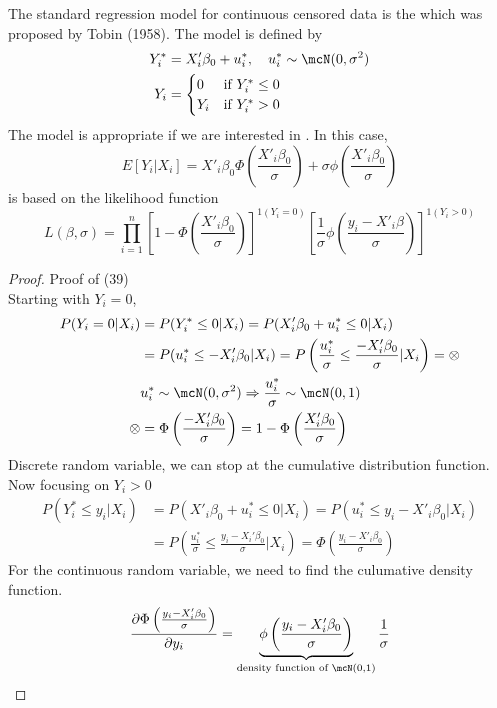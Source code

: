 The standard regression model for continuous censored data is the  which was proposed by Tobin (1958).
The model is defined by 
\begin{align*}
    Y^*_i & = X'_i\beta_0 + u_i^*,\quad u_i^*\sim\mcN(0,\sigma^2)\\
    Y_i & = \begin{cases}
        0 & \text{if }Y_i^* \leq 0\\
        Y_i & \text{if }Y_i^*>0
    \end{cases}
\end{align*}
The model is appropriate if we are interested in .
In this case,
\begin{equation*}
    E[Y_i|X_i] = X'_i\beta_0\Phi(\frac{X'_i\beta_0}{\sigma})+\sigma\phi(\frac{X'_i\beta_0}{\sigma})
\end{equation*}
 is based on the likelihood function 
\begin{equation}
    L(\beta,\sigma) = \prod_{i=1}^{n}\left[1-\Phi(\frac{X'_i\beta_0}{\sigma})\right]^{1(Y_i=0)}\left[\frac{1}{\sigma}\phi\left(\frac{y_i-X'_i\beta}{\sigma}\right)\right]^{1(Y_i>0)}
\end{equation}
\begin{proof}
    Proof of (39)\\
    Starting with $Y_i=0$,
    \begin{align*}
        P(Y_i=0|X_i) & = P(Y_i^*\leq 0|X_i) = P(X'_i\beta_0+u_i^*\leq 0|X_i)\\
        & = P(u_i^*\leq -X'_i\beta_0|X_i) = P\left(\frac{u_i^*}{\sigma}\leq\frac{-X_i'\beta_0}{\sigma}|X_i\right) = \otimes \\
        & u_i^*\sim\mcN(0,\sigma^2)\Rightarrow\frac{u_i^*}{\sigma}\sim\mcN(0,1)\\
        \otimes & = \Phi\left(\frac{-X'_i\beta_0}{\sigma}\right) = 1-\Phi\left(\frac{X'_i\beta_0}{\sigma}\right)
    \end{align*}
    Discrete random variable, we can stop at the cumulative distribution function. Now focusing on $Y_i>0$
    \begin{align*}
        P(Y_i^*\leq y_i|X_i) & = P(X'_i\beta_0+u_i^*\leq 0|X_i) = P(u_i^*\leq y_i-X'_i\beta_0|X_i)\\
        & = P\left(\frac{u_i^*}{\sigma}\leq\frac{y_i-X_i'\beta_0}{\sigma}|X_i\right) = \Phi\left(\frac{y_i-X'_i\beta_0}{\sigma}\right)
    \end{align*}
    For the continuous random variable, we need to find the culumative density function.
    \begin{equation*}
        \frac{\partial\Phi\left(\frac{y_i-X'_i\beta_0}{\sigma}\right)}{\partial y_i} = \underbrace{\phi\left(\frac{y_i-X'_i\beta_0}{\sigma}\right)}_{\text{density function of }\mcN(0,1)}\frac{1}{\sigma}
    \end{equation*}
\end{proof}

